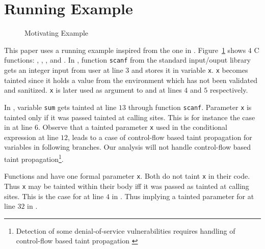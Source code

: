 \section{Running Example}\label{sec:example} 

\begin{figure}[!ht]
\centering
{}
\caption{Motivating Example}
\label{fig:sample}
\end{figure}

This paper uses a running example inspired from
the one in \cite{Dimitru:2009:STAC}.
Figure~\ref{fig:sample} shows $4$ C functions:
\main{}, \compute{}, \odd{}, and \even{}.
In \main{}, function \texttt{scanf} from the standard input/ouput
library gets an integer input from user at line $3$
and stores it in variable \texttt{x}. \texttt{x} 
becomes tainted since it holds a value from
the environment which has not been validated and
sanitized.
\texttt{x} is later used as argument to \even{} and \odd{}
at lines $4$ and $5$ respectively.

In \compute{}, variable \texttt{sum} gets tainted at
line $13$ through function \texttt{scanf}. Parameter
\texttt{x} is tainted only if it was passed tainted
at calling sites.
This is for instance the case in \main{} at line $6$.
Observe that a tainted parameter \texttt{x} used in
the conditional expression at line $12$, leads to
a case of control-flow based taint propagation for
variables in following branches.
Our analysis will not handle control-flow based taint
propagation\footnote{Detection of some denial-of-service
vulnerabilities requires handling of control-flow based
taint propagation \cite{Chang:2009:ICS}}. 

Functions \even{} and \odd{} have one formal parameter
\texttt{x}. Both do not taint \texttt{x} in their code.
Thus \texttt{x} may be tainted within their body iff it was
passed as tainted at calling sites. This is the case
for \even{} at line $4$ in \main{}. Thus implying a tainted
parameter for \odd{} at line $32$ in \even{}.